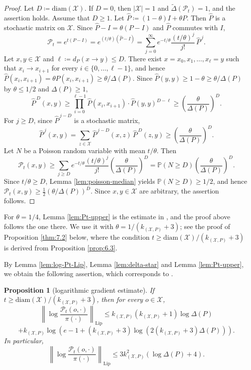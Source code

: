 \documentclass[a4paper, reqno, 11pt]{amsart}
\newtheorem{Prop}[Thm]{Proposition}
\theoremstyle{definition}
\begin{document}
\begin{proof}
Let $D \coloneqq \mathrm{diam}(\mathcal{X})$.
If $D = 0$, then $|\mathcal{X}| = 1$ and $\widetilde{\Delta}(\mathscr{P}_t) = 1$, and the assertion holds.
Assume that $D \ge 1$.
Let $\widehat{P} \coloneqq (1-\theta) I + \theta P$.
Then $\widehat{P}$ is a stochastic matrix on $\mathcal{X}$.
Since $\widehat{P} - I = \theta (P - I)$ and $\widehat{P}$ commutes with $I$,
\[ \mathscr{P}_t = e^{t(P-I)} = e^{(t/\theta)(\widehat{P} - I)} = \sum_{j=0}^{\infty} e^{-t/\theta} \frac{(t/\theta)^{j}}{j!}\, \widehat{P}^{\,j}. \]
Let $x, y \in \mathcal{X}$ and $\ell \coloneqq d_{P}(x \to y) \le D$.
There exist $x = x_0, x_1, \dots, x_\ell = y$ such that $x_i \to x_{i+1}$ for every $i \in \{0, \dots, \ell-1\}$,
and hence $\widehat{P}(x_i, x_{i+1}) = \theta P(x_i, x_{i+1}) \ge \theta/\Delta(P)$.
Since $\widehat{P}(y,y) \ge 1 - \theta \ge \theta/\Delta(P)$ by $\theta \le 1/2$ and $\Delta(P) \ge 1$,
\[ \widehat{P}^{\,D}(x,y) \ge \prod_{i=0}^{\ell-1} \widehat{P}(x_i, x_{i+1}) \cdot \widehat{P}(y,y)^{D-\ell} \ge \left(\frac{\theta}{\Delta(P)}\right)^{D}. \]
For $j \ge D$, since $\widehat{P}^{\,j-D}$ is a stochastic matrix,
\[ \widehat{P}^{\,j}(x,y) = \sum_{z \in \mathcal{X}} \widehat{P}^{\,j-D}(x,z)\, \widehat{P}^{\,D}(z,y) \ge \left(\frac{\theta}{\Delta(P)}\right)^{D}. \]
Let $N$ be a Poisson random variable with mean $t/\theta$.
Then
\[ \mathscr{P}_t(x,y) \ge \sum_{j \ge D} e^{-t/\theta} \frac{(t/\theta)^{j}}{j!} \left(\frac{\theta}{\Delta(P)}\right)^{D}
 = \mathbb{P}(N \ge D) \left(\frac{\theta}{\Delta(P)}\right)^{D}. \]
Since $t/\theta \ge D$, Lemma \ref{lem:poisson-median} yields $\mathbb{P}(N \ge D) \ge 1/2$, and hence
$\mathscr{P}_t(x,y) \ge \frac{1}{2} \left(\theta/\Delta(P)\right)^{D}$.
Since $x, y \in \mathcal{X}$ are arbitrary, the assertion follows.
\end{proof}

For $\theta = 1/4$, Lemma \ref{lem:Pt-upper} is the estimate in \cite[Eq. (16)]{Salez2024}, and the proof above follows the one there.
We use it with $\theta = 1/(k_{(\mathcal{X}, P)}+3)$; see the proof of Proposition \ref{thm:7.2} below, where the condition $t \ge \mathrm{diam}(\mathcal{X})/(k_{(\mathcal{X}, P)}+3)$ is derived from Proposition \ref{prop:6.3}.

By Lemma \ref{lem:log-Pt-Lip}, Lemma \ref{lem:delta-star} and Lemma \ref{lem:Pt-upper}, we obtain the following assertion, which corresponds to \cite[Lemma 10]{Salez2024}. 

\begin{Prop}[logarithmic gradient estimate]\label{thm:3.14}
If $t \ge \mathrm{diam}(\mathcal{X})/(k_{(\mathcal{X}, P)}+3)$, then for every $o \in \mathcal{X}$,
\[ \left\|\log\frac{\mathscr{P}_t (o,\cdot)}{\pi(\cdot)}\right\|_{\mathrm{Lip}} \le k_{(\mathcal{X}, P)} \left(k_{(\mathcal{X}, P)}+1\right) \log\Delta(P) \]
\[ + k_{(\mathcal{X}, P)} \log\left(e - 1 + (k_{(\mathcal{X}, P)}+3) \log\left(2 (k_{(\mathcal{X}, P)}+3) \Delta(P)\right)\right). \]
In particular,
\[ \left\|\log\frac{\mathscr{P}_t (o,\cdot)}{\pi(\cdot)}\right\|_{\mathrm{Lip}} \le 3k_{(\mathcal{X}, P)}^2(\log\Delta(P) + 4). \]
\end{Prop}
\end{document}
